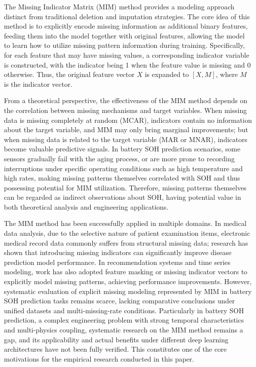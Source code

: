 \documentclass[10pt,a4paper]{article}
\begin{document}
The Missing Indicator Matrix (MIM) method provides a modeling approach distinct from traditional deletion and imputation strategies\cite{jones1996indicator,van2023missing}. The core idea of this method is to explicitly encode missing information as additional binary features, feeding them into the model together with original features, allowing the model to learn how to utilize missing pattern information during training\cite{ipsen2022deal}. Specifically, for each feature that may have missing values, a corresponding indicator variable is constructed, with the indicator being 1 when the feature value is missing and 0 otherwise. Thus, the original feature vector $X$ is expanded to $[X, M]$, where $M$ is the indicator vector.

From a theoretical perspective, the effectiveness of the MIM method depends on the correlation between missing mechanisms and target variables. When missing data is missing completely at random (MCAR), indicators contain no information about the target variable, and MIM may only bring marginal improvements; but when missing data is related to the target variable (MAR or MNAR), indicators become valuable predictive signals. In battery SOH prediction scenarios, some sensors gradually fail with the aging process, or are more prone to recording interruptions under specific operating conditions such as high temperature and high rates, making missing patterns themselves correlated with SOH and thus possessing potential for MIM utilization. Therefore, missing patterns themselves can be regarded as indirect observations about SOH, having potential value in both theoretical analysis and engineering applications.

The MIM method has been successfully applied in multiple domains. In medical data analysis, due to the selective nature of patient examination items, electronic medical record data commonly suffers from structural missing data; research has shown that introducing missing indicators can significantly improve disease prediction model performance\cite{sisk2023imputation,ehrig2025imputation}. In recommendation systems and time series modeling, work has also adopted feature masking or missing indicator vectors to explicitly model missing patterns, achieving performance improvements\cite{ipsen2022deal,che2018recurrent}. However, systematic evaluation of explicit missing modeling represented by MIM in battery SOH prediction tasks remains scarce, lacking comparative conclusions under unified datasets and multi-missing-rate conditions. Particularly in battery SOH prediction, a complex engineering problem with strong temporal characteristics and multi-physics coupling, systematic research on the MIM method remains a gap, and its applicability and actual benefits under different deep learning architectures have not been fully verified. This constitutes one of the core motivations for the empirical research conducted in this paper.
\end{document}

